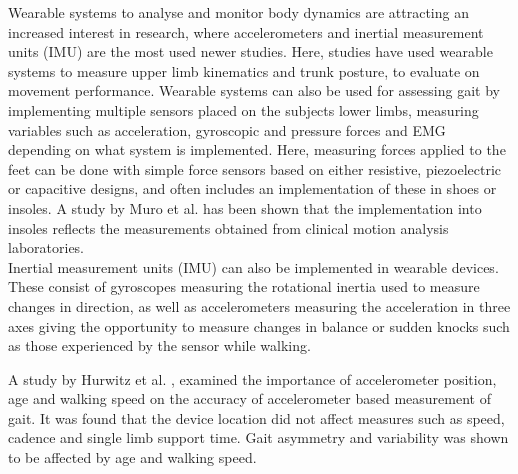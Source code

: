 Wearable systems to analyse and monitor body dynamics are attracting an increased interest in research, where accelerometers and inertial measurement units (IMU) are the most used newer studies. Here, studies have used wearable systems to measure upper limb kinematics and trunk posture, to evaluate on movement performance. \cite{Wang2017} Wearable systems can also be used for assessing gait by implementing multiple sensors placed on the subjects lower limbs, measuring variables such as acceleration, gyroscopic and pressure forces and EMG depending on what system is implemented. Here, measuring forces applied to the feet can be done with simple force sensors based on either resistive, piezoelectric or capacitive designs, and often includes an implementation of these in shoes or insoles. \cite{Muro2014} A study by Muro et al. \cite{Muro2014} has been shown that the implementation into insoles reflects the measurements obtained from clinical motion analysis laboratories. \\
Inertial measurement units (IMU) can also be implemented in wearable devices. These consist of gyroscopes measuring the rotational inertia used to measure changes in direction, as well as accelerometers measuring the acceleration in three axes giving the opportunity to measure changes in balance or sudden knocks such as those experienced by the sensor while walking. \cite{Muro2014}

A study by Hurwitz et al. \cite{Hurwitz2016}, examined the importance of accelerometer position, age and walking speed on the accuracy of accelerometer based measurement of gait. It was found that the device location did not affect measures such as speed, cadence and single limb support time. Gait asymmetry and variability was shown to be affected by age and walking speed. 




